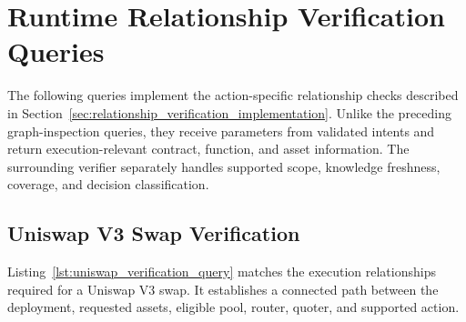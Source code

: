 
\section{Runtime Relationship Verification Queries}
\label{app:runtime_verification_queries}

The following queries implement the action-specific
relationship checks described in
Section~\ref{sec:relationship_verification_implementation}.
Unlike the preceding graph-inspection queries, they
receive parameters from validated intents and return
execution-relevant contract, function, and asset
information. The surrounding verifier separately
handles supported scope, knowledge freshness, coverage,
and decision classification.



\subsection{Uniswap V3 Swap Verification}

Listing~\ref{lst:uniswap_verification_query} matches
the execution relationships required for a Uniswap V3
swap. It establishes a connected path between the
deployment, requested assets, eligible pool, router,
quoter, and supported action.

